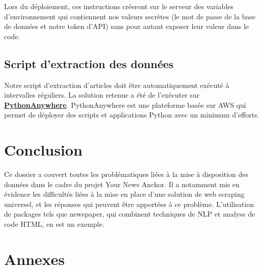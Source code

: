 \documentclass[french]{article}
\begin{document}
    Lors du déploiement, ces instructions créeront sur le serveur des variables d'environnement qui contiennent nos valeurs secrètes (le mot de passe de la base de données et notre token d'API) sans pour autant exposer leur valeur dans le code.

    \subsection{Script d'extraction des données}

    Notre script d'extraction d'articles doit être automatiquement exécuté à intervalles réguliers. La solution retenue a été de l'exécuter sur \textbf{\href{https://www.pythonanywhere.com/}{PythonAnywhere}}. PythonAnywhere est une plateforme basée sur AWS qui permet de déployer des scripts et applications Python avec un minimum d'efforts.

    \section*{Conclusion}

    Ce dossier a couvert toutes les problématiques liées à la mise à disposition des données dans le cadre du projet Your News Anchor. Il a notamment mis en évidence les difficultés liées à la mise en place d'une solution de web scraping universel, et les réponses qui peuvent être apportées à ce problème. L'utilisation de packages tels que newspaper, qui combinent techniques de NLP et analyse de code HTML, en est un exemple.


    \appendix
    \newpage
    \section*{Annexes \huge \centering}
\end{document}
